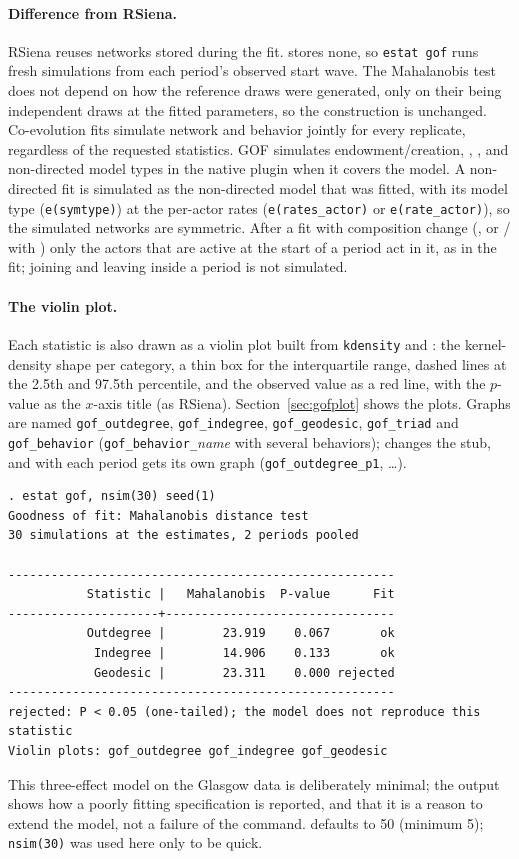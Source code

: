 \paragraph{Difference from RSiena.} RSiena reuses networks stored during the fit. \nwsaom{} stores none, so \texttt{estat gof} runs fresh simulations from each period's observed start wave. The Mahalanobis test does not depend on how the reference draws were generated, only on their being independent draws at the fitted parameters, so the construction is unchanged. Co-evolution fits simulate network and behavior jointly for every replicate, regardless of the requested statistics. GOF simulates endowment/creation, , ,  and non-directed model types in the native plugin when it covers the model. A non-directed fit is simulated as the non-directed model that was fitted, with its model type (\texttt{e(symtype)}) at the per-actor rates (\texttt{e(rates\_actor)} or \texttt{e(rate\_actor)}), so the simulated networks are symmetric. After a fit with composition change (, or / with ) only the actors that are active at the start of a period act in it, as in the fit; joining and leaving inside a period is not simulated.

\paragraph{The violin plot.} Each statistic is also drawn as a violin plot built from \texttt{kdensity} and : the kernel-density shape per category, a thin box for the interquartile range, dashed lines at the 2.5th and 97.5th percentile, and the observed value as a red line, with the $p$-value as the $x$-axis title (as RSiena). Section~\ref{sec:gofplot} shows the plots. Graphs are named \texttt{gof\_outdegree}, \texttt{gof\_indegree}, \texttt{gof\_geodesic}, \texttt{gof\_triad} and \texttt{gof\_behavior} (\texttt{gof\_behavior\_}\emph{name} with several behaviors);  changes the stub, and with  each period gets its own graph (\texttt{gof\_outdegree\_p1}, \ldots).

\begin{lstlisting}
. estat gof, nsim(30) seed(1)
Goodness of fit: Mahalanobis distance test
30 simulations at the estimates, 2 periods pooled

------------------------------------------------------
           Statistic |   Mahalanobis  P-value      Fit
---------------------+--------------------------------
           Outdegree |        23.919    0.067       ok
            Indegree |        14.906    0.133       ok
            Geodesic |        23.311    0.000 rejected
------------------------------------------------------
rejected: P < 0.05 (one-tailed); the model does not reproduce this statistic
Violin plots: gof_outdegree gof_indegree gof_geodesic
\end{lstlisting}
This three-effect model on the Glasgow data is deliberately minimal; the output shows how a poorly fitting specification is reported, and that it is a reason to extend the model, not a failure of the command.  defaults to 50 (minimum 5); \texttt{nsim(30)} was used here only to be quick.

